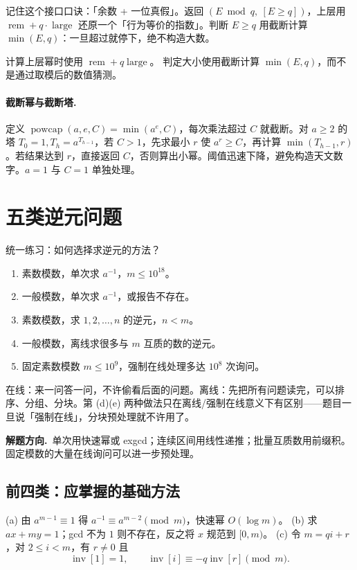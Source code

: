 \documentclass[UTF8,a4paper,11pt,oneside,openany,fontset=fandol]{ctexbook}
\theoremstyle{definition}
\newcommand{\iva}[1]{\left[#1\right]}
\newcommand{\hint}{\par\noindent\textbf{解题方向.}\ }
\begin{document}
\begin{tip}
记住这个接口口诀：「余数 + 一位真假」。返回 $(E\bmod q,\ \iva{E\ge q})$，上层用 $\operatorname{rem}+q\cdot\operatorname{large}$ 还原一个「行为等价的指数」。判断 $E\ge q$ 用截断计算 $\min(E,q)$：一旦超过就停下，绝不构造大数。
\end{tip}

计算上层幂时使用 $\operatorname{rem}+q\operatorname{large}$。
判定大小使用截断计算 $\min(E,q)$，而不是通过取模后的数值猜测。

\paragraph{截断幂与截断塔.} 定义 $\operatorname{powcap}(a,e,C)=\min(a^e,C)$，每次乘法超过 $C$ 就截断。对 $a\ge2$ 的塔 $T_0=1,T_h=a^{T_{h-1}}$，若 $C>1$，先求最小 $r$ 使 $a^r\ge C$，再计算 $\min(T_{h-1},r)$。若结果达到 $r$，直接返回 $C$，否则算出小幂。阈值迅速下降，避免构造天文数字。$a=1$ 与 $C=1$ 单独处理。


\section{五类逆元问题}
\begin{problem}{统一练习：如何选择求逆元的方法？}
\begin{enumerate}[label=(\alph*)]
\item 素数模数，单次求 $a^{-1}$，$m\le10^{18}$。
\item 一般模数，单次求 $a^{-1}$，或报告不存在。
\item 素数模数，求 $1,2,\ldots,n$ 的逆元，$n<m$。
\item 一般模数，离线求很多与 $m$ 互质的数的逆元。
\item 固定素数模数 $m\le10^9$，强制在线处理多达 $10^8$ 次询问。
\end{enumerate}
\end{problem}

\begin{tip}[在线/离线]
在线：来一问答一问，不许偷看后面的问题。离线：先把所有问题读完，可以排序、分组、分块。第 (d)(e) 两种做法只在离线/强制在线意义下有区别——题目一旦说「强制在线」，分块预处理就不许用了。
\end{tip}

\hint 单次用快速幂或 exgcd；连续区间用线性递推；批量互质数用前缀积。固定模数的大量在线询问可以进一步预处理。


\subsection{前四类：应掌握的基础方法}
(a) 由 $a^{m-1}\equiv1$ 得 $a^{-1}\equiv a^{m-2}\pmod m$，快速幂 $O(\log m)$。
(b) 求 $ax+my=1$；gcd 不为 $1$ 则不存在，反之将 $x$ 规范到 $[0,m)$。
(c) 令 $m=qi+r$，对 $2\le i<m$，有 $r\ne0$ 且
\[
 \operatorname{inv}[1]=1,\qquad
 \operatorname{inv}[i]\equiv-q\operatorname{inv}[r]\pmod m.
\]
\end{document}
